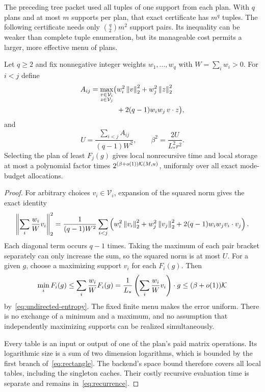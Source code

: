 The preceding tree packet used all tuples of one support from each plan.
With $q$ plans and at most $m$ supports per plan, that exact certificate
has $m^q$ tuples. The following certificate needs only $\binom q2m^2$
support pairs. Its inequality can be weaker than complete tuple
enumeration, but its manageable cost permits a larger, more effective
menu of plans.

\begin{theorem}\label{thm:pair}
Let $q\ge2$ and fix nonnegative integer weights $w_1,\ldots,w_q$ with
$W=\sum_iw_i>0$. For $i<j$ define
\begin{align}
 A_{ij}=\max_{\substack{v\in\mathcal V_i\\z\in\mathcal V_j}}
 \bigl(&w_i^2\left\|v\right\|_2^2+w_j^2\left\|z\right\|_2^2\notag\\
       &+2(q-1)w_iw_j\,v\cdot z\bigr),\label{eq:pair-max}
\end{align}
and
\[
 U=\frac{\sum_{i<j}A_{ij}}{(q-1)W^2},\qquad
 \beta^2=\frac{2U}{L_*^2r^2}.
\]
Selecting the plan of least $F_j(g)$ gives local nonrecursive time and
local storage at most a polynomial factor times
$2^{(\beta+o(1))\mathcal K(M,u)}$, uniformly over all exact mode-budget
allocations.
\end{theorem}

\begin{proof}
For arbitrary choices $v_i\in\mathcal V_i$, expansion of the squared norm
gives the exact identity
\begin{align*}
 \left\|\sum_i\frac{w_i}{W}v_i\right\|_2^2
 =\frac1{(q-1)W^2}\sum_{i<j}
 \left(w_i^2\left\|v_i\right\|_2^2+w_j^2\left\|v_j\right\|_2^2
       +2(q-1)w_iw_jv_i\cdot v_j\right).
\end{align*}
Each diagonal term occurs $q-1$ times. Taking the maximum of each pair
bracket separately can only increase the sum, so the squared norm is at most $U$.
For a given $g$, choose a maximizing support $v_i$ for each $F_i(g)$.
Then
\[
 \min_iF_i(g)\le\sum_i\frac{w_i}{W}F_i(g)
 =\frac1{L_*}\left(\sum_i\frac{w_i}{W}v_i\right)\cdot g
 \le(\beta+o(1))\mathcal K
\]
by~\eqref{eq:undirected-entropy}. The fixed finite menu makes the error
uniform. There is no exchange of a minimum and a maximum, and no assumption
that independently maximizing supports can be realized simultaneously.

Every table is an input or output of one of the plan's paid matrix
operations. Its logarithmic size is a sum of two dimension logarithms,
which is bounded by the first branch of~\eqref{eq:rectangle}. The
backend's space bound therefore covers all local tables, including the
singleton caches. Their costly recursive evaluation time is separate and
remains in~\eqref{eq:recurrence}.
\end{proof}

